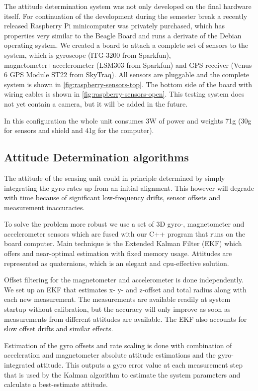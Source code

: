 The attitude determination system was not only developed on the final hardware itself.
For continuation of the development during the semester break a recently released Raspberry Pi minicomputer was privately purchased, which has properties very similar to the Beagle Board and runs a derivate of the Debian operating system.
We created a board to attach a complete set of sensors to the system, which is gyroscope (ITG-3200 from Sparkfun), magnetometer+accelerometer (LSM303 from Sparkfun) and GPS receiver (Venus 6 GPS Module
ST22 from SkyTraq).
All sensors are pluggable and the complete system is shown in \autoref{fig:raspberry-sensors-top}.
The bottom side of the board with wiring cables is shown in \autoref{fig:raspberry-sensors-open}.
This testing system does not yet contain a camera, but it will be added in the future.

In this configuration the whole unit consumes 3W of power and weights 71g (30g for sensors and shield and 41g for the computer).



\subsection{Attitude Determination algorithms}
The attitude of the sensing unit could in principle determined by simply integrating the gyro rates up from an initial alignment.
This however will degrade with time because of significant low-frequency drifts, sensor offsets and measurement inaccuracies.

To solve the problem more robust we use a set of 3D gyro-, magnetometer and accelerometer sensors which are fused with our C++ program that runs on the board computer.
Main technique is the Extended Kalman Filter (EKF) which offers and near-optimal estimation with fixed memory usage.
Attitudes are represented as quaternions, which is an elegant and cpu-effective solution.

Offset filtering for the magnetometer and accelerometer is done independently.
We set up an EKF that estimates x- y- and z-offset and total radius along with each new measurement.
The measurements are available readily at system startup without calibration, but the accuracy will only improve as soon as measurements from different attitudes are available.
The EKF also accounts for slow offset drifts and similar effects.

Estimation of the gyro offsets and rate scaling is done with combination of acceleration and magnetometer absolute attitude estimations and the gyro-integrated attitude.
This outputs a gyro error value at each measurement step that is used by the Kalman algorithm to estimate the system parameters and calculate a best-estimate attitude.

